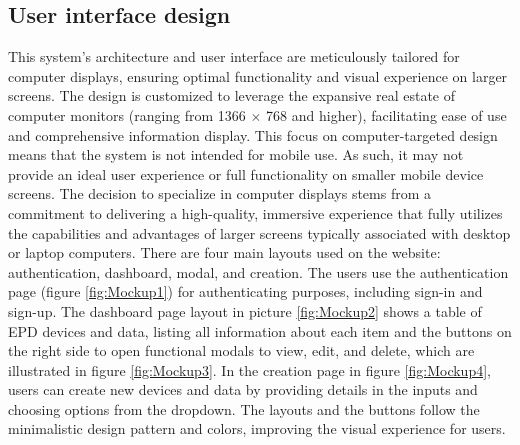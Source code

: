 \documentclass[../Main.tex]{subfiles}
\begin{document}
\subsection{User interface design}
This system's architecture and user interface are meticulously tailored for computer displays, ensuring optimal functionality and visual experience on larger screens. The design is customized to leverage the expansive real estate of computer monitors (ranging from 1366 \(\times\) 768 and higher), facilitating ease of use and comprehensive information display. This focus on computer-targeted design means that the system is not intended for mobile use. As such, it may not provide an ideal user experience or full functionality on smaller mobile device screens. The decision to specialize in computer displays stems from a commitment to delivering a high-quality, immersive experience that fully utilizes the capabilities and advantages of larger screens typically associated with desktop or laptop computers. There are four main layouts used on the website: authentication, dashboard, modal, and creation. The users use the authentication page (figure \ref{fig:Mockup1}) for authenticating purposes, including sign-in and sign-up. The dashboard page layout in picture \ref{fig:Mockup2} shows a table of EPD devices and data, listing all information about each item and the buttons on the right side to open functional modals to view, edit, and delete, which are illustrated in figure \ref{fig:Mockup3}. In the creation page in figure \ref{fig:Mockup4}, users can create new devices and data by providing details in the inputs and choosing options from the dropdown. The layouts and the buttons follow the minimalistic design pattern and colors, improving the visual experience for users.
\end{document}
